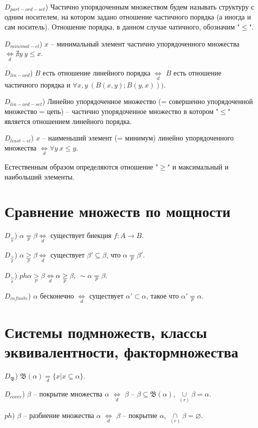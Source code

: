 \documentclass[a4paper]{article}
\newcommand{\Def}[0]{\underset{d}{\Leftrightarrow}}
\newcommand{\defeq}[0]{\underset{d}{=}}
\newcommand{\eqp}[0]{\underset{p}{=}}
\newcommand{\geqp}[0]{\underset{p}{\geq}}
\newcommand{\gtp}[0]{\underset{p}{>}}
\newcommand{\capr}[0]{\underset{(r)}{\cap}}
\newcommand{\cupr}[0]{\underset{(r)}{\cup}}
\begin{document}
$D_{part-ord-set}$) Частично упорядоченным множеством будем называть структуру с одним носителем, на котором задано отношение частичного порядка (а иногда и сам носитель). Отношение порядка, в данном случае чатичного, обозначим "$\leq$".

$D_{minimal-el}$) $x$ -- минимальный элемент частично упорядоченного множества $\Def \nexists y~y \leq x$.

$D_{lin-ord}$) $B$ есть отношение линейного порядка $\Def$ $B$ есть отношение частичного порядка и $\forall x, y~(B(x, y); B(y, x)))$.

$D_{lin-ord-set}$) Линейно упорядоченное множество (= совершенно упорядоченной множество = цепь) -- частично упорядоченное множество в котором "$\leq$" является отношением линейного порядка.

$D_{least-el}$) $x$ -- наименьший элемент (= минимум) линейно упорядоченного множества $\Def \forall y~x \leq y$.

Естественным образом определяются отношение "$\geq$" и максимальный и наибольший элементы.

\section{Сравнение множеств по мощности}

$D_{\eqp}$) $\alpha \eqp \beta \Def$ существует биекция $f: A \rightarrow B$.

$D_{\geqp}$) $\alpha \geqp \beta \Def$ существует $\beta' \subseteq \beta$, что $\alpha \eqp \beta'$.

$D_{\gtp}$) $ph\alpha \gtp \beta \Def \alpha \geqp \beta,~\sim \alpha \eqp \beta$.

$D_{infinite}$) $\alpha$ бесконечно $\Def$ существует $\alpha' \subset \alpha$, такое что $\alpha' \eqp \alpha$.

\section{Системы подмножеств, классы эквивалентности, фактормножества}

$D_{\mathfrak{B}}$) $\mathfrak{B}(\alpha) \defeq \{ x | x \subseteq \alpha \}$.

$D_{cover}$) $\beta$ -- покрытие множества $\alpha$ $\Def$ $\beta$ -- $\beta \subseteq \mathfrak{B}(\alpha)$, $\cupr \beta = \alpha$.

$ph$) $\beta$ -- разбиение множества $\alpha$ $\Def$ $\beta$ -- покрытие $\alpha$, $\capr \beta = \varnothing$.
\end{document}
